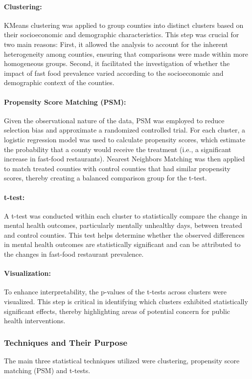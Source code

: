 \documentclass[letterpaper, 11pt]{report}
\begin{document}
\paragraph{Clustering:}
KMeans clustering was applied to group counties into distinct clusters based on their socioeconomic and demographic characteristics. This step was crucial for two main reasons: First, it allowed the analysis to account for the inherent heterogeneity among counties, ensuring that comparisons were made within more homogeneous groups. Second, it facilitated the investigation of whether the impact of fast food prevalence varied according to the socioeconomic and demographic context of the counties.

\paragraph{Propensity Score Matching (PSM):}
Given the observational nature of the data, PSM was employed to reduce selection bias and approximate a randomized controlled trial. For each cluster, a logistic regression model was used to calculate propensity scores, which estimate the probability that a county would receive the treatment (i.e., a significant increase in fast-food restaurants). Nearest Neighbors Matching was then applied to match treated counties with control counties that had similar propensity scores, thereby creating a balanced comparison group for the t-test.

\paragraph{t-test:}
A t-test was conducted within each cluster to statistically compare the change in mental health outcomes, particularly mentally unhealthy days, between treated and control counties. This test helps determine whether the observed differences in mental health outcomes are statistically significant and can be attributed to the changes in fast-food restaurant prevalence.

\paragraph{Visualization:}
To enhance interpretability, the p-values of the t-tests across clusters were visualized. This step is critical in identifying which clusters exhibited statistically significant effects, thereby highlighting areas of potential concern for public health interventions.

\subsubsection{Techniques and Their Purpose}
The main three statistical techniques utilized were clustering, propensity score matching (PSM) and t-tests.
\end{document}
